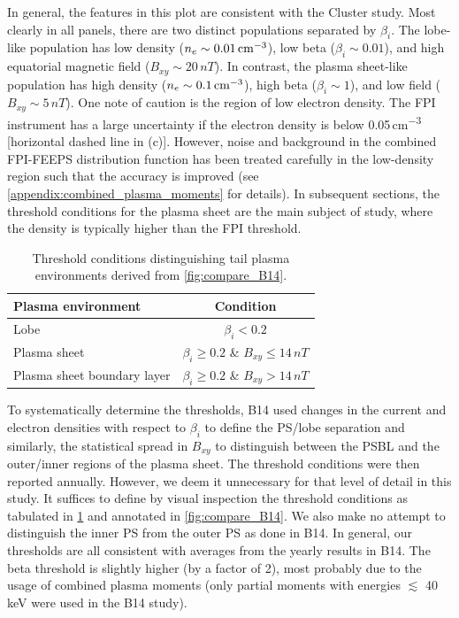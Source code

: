 \documentclass[draft]{agujournal2019}
\begin{document}
In general, the features in this plot are consistent with the Cluster study. Most clearly in all panels, there are two distinct populations separated by $\beta_i$. The lobe-like population has low density (${n_e\sim0.01\,\si{cm\tothe{-3}}}$), low beta (${\beta_i\sim0.01}$), and high equatorial magnetic field (${B_{xy}\sim20\,\si{nT}}$). In contrast, the plasma sheet-like population has high density (${n_e\sim0.1\,\si{cm\tothe{-3}}}$), high beta (${\beta_i\sim1}$), and low field (${B_{xy}\sim5\,\si{nT}}$). One note of caution is the region of low electron density. The FPI instrument has a large uncertainty if the electron density is below \mbox{0.05\,\si{cm\tothe{-3}}} [horizontal dashed line in (c)]. However, noise and background in the combined FPI-FEEPS distribution function has been treated carefully in the low-density region such that the accuracy is improved (see \mbox{\ref{appendix:combined_plasma_moments}} for details). In subsequent sections, the threshold conditions for the plasma sheet are the main subject of study, where the density is typically higher than the FPI threshold.

\begin{table}
\caption{Threshold conditions distinguishing tail plasma environments derived from \cref{fig:compare_B14}.}
\label{tab:threshold_conditions}
\centering
\begin{tabular}{l c}
\hline
 Plasma environment             & Condition  \\
\hline
  Lobe                          & ${\beta_i<0.2}$  \\
  Plasma sheet                  & ${\beta_i\geq0.2}$ \& ${B_{xy}\leq14\,\si{nT}}$  \\
  Plasma sheet boundary layer   & ${\beta_i\geq0.2}$ \& ${B_{xy}>14\,\si{nT}}$  \\
\hline
\end{tabular}
\end{table}

To systematically determine the thresholds, B14 used changes in the current and electron densities with respect to $\beta_i$ to define the PS/lobe separation and similarly, the statistical spread in $B_{xy}$ to distinguish between the PSBL and the outer/inner regions of the plasma sheet. The threshold conditions were then reported annually. However, we deem it unnecessary for that level of detail in this study. It suffices to define by visual inspection the threshold conditions as tabulated in \cref{tab:threshold_conditions} and annotated in \cref{fig:compare_B14}. We also make no attempt to distinguish the inner PS from the outer PS as done in B14. In general, our thresholds are all consistent with averages from the yearly results in B14. The beta threshold is slightly higher (by a factor of 2), most probably due to the usage of combined plasma moments (only partial moments with energies $\lesssim$ 40\,\si{keV} were used in the B14 study).
\end{document}
